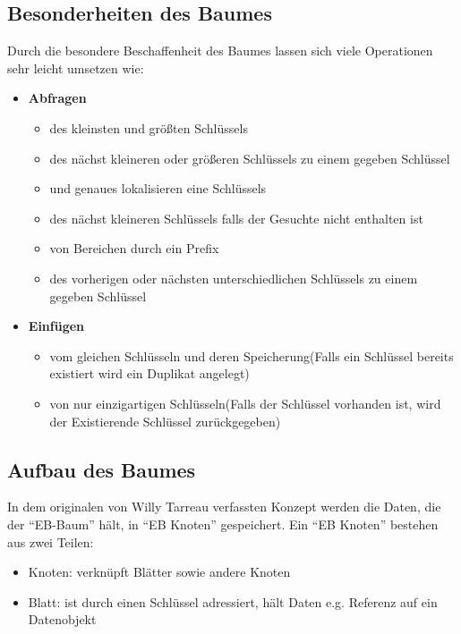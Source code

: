 \documentclass[a4paper,11pt,oneside,%
headsepline,												%
footsepline,												%
bibtotocnumbered									%
]{scrreprt}
\begin{document}
\subsection{Besonderheiten des Baumes}
Durch die besondere Beschaffenheit des Baumes lassen sich viele Operationen sehr leicht umsetzen wie:
\begin{itemize}
	\item \textbf{Abfragen}
	\begin{itemize}
		\item des kleinsten und größten Schlüssels
		\item des nächst kleineren oder größeren Schlüssels zu einem gegeben Schlüssel
		\item und genaues lokalisieren eine Schlüssels
		\item des nächst kleineren Schlüssels falls der Gesuchte nicht enthalten ist
		\item von Bereichen durch ein Prefix
		\item des vorherigen oder nächsten unterschiedlichen Schlüssels zu einem gegeben Schlüssel
	\end{itemize}
	\item \textbf{Einfügen}
	\begin{itemize}
		\item vom gleichen Schlüsseln und deren Speicherung(Falls ein Schlüssel bereits existiert wird ein Duplikat angelegt)
		\item von nur einzigartigen Schlüsseln(Falls der Schlüssel vorhanden ist, wird der  Existierende Schlüssel zurückgegeben)
	\end{itemize}
\end{itemize}


\subsection{Aufbau des Baumes}
In dem originalen von Willy Tarreau verfassten Konzept\autocite[Absatz Definitions]{Tarreau} werden die Daten, die der \enquote{EB-Baum} hält, in \enquote{EB Knoten}
gespeichert. Ein \enquote{EB Knoten} bestehen aus zwei Teilen:
\begin{itemize}
\item Knoten: verknüpft Blätter sowie andere Knoten
\item Blatt: ist durch einen Schlüssel adressiert, hält Daten e.g. Referenz auf ein Datenobjekt
\end{itemize}
\end{document}
